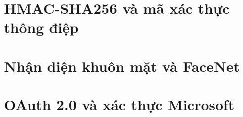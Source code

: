 \section{HMAC-SHA256 và mã xác thực thông điệp}
\label{sec:hmac}

\section{Nhận diện khuôn mặt và FaceNet}
\label{sec:face-recognition}

\section{OAuth 2.0 và xác thực Microsoft}
\label{sec:oauth}

